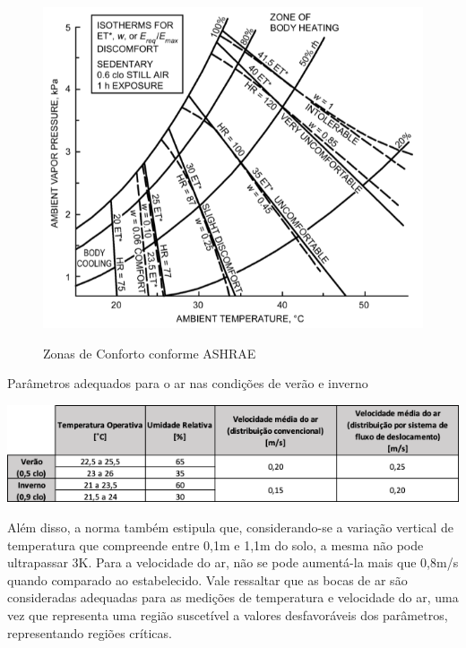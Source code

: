 \documentclass[acronym,symbols]{fei}
\begin{document}
\begin{figure}[!htb] 
 \centering
    \caption{Zonas de Conforto conforme ASHRAE}
    \includegraphics[width=0.8\linewidth]{Imagens/Zonas_Conforto.png}
    \label{fig: Zonas_Conforto}
\end{figure}

\begin{table}[!htb] 
 \centering
    \caption{Parâmetros adequados para o ar nas condições de verão e inverno}
    \includegraphics[width=0.8\linewidth]{Imagens/Tabela_ABNT.png}
    \label{tab: Parâmetros Ar}
\end{table}

Além disso, a norma \textcite{abnt216401} também estipula que, considerando-se a variação vertical de temperatura que compreende entre 0,1m e 1,1m do solo, a mesma não pode ultrapassar 3K. Para a velocidade do ar, não se pode aumentá-la mais que 0,8m/s quando comparado ao estabelecido. Vale ressaltar que as bocas de ar são consideradas adequadas para as medições de temperatura e velocidade do ar, uma vez que representa uma região suscetível a valores desfavoráveis dos parâmetros, representando regiões críticas. 


\end{document}
